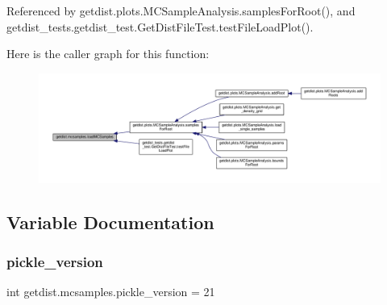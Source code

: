 Referenced by getdist.\+plots.\+M\+C\+Sample\+Analysis.\+samples\+For\+Root(), and getdist\+\_\+tests.\+getdist\+\_\+test.\+Get\+Dist\+File\+Test.\+test\+File\+Load\+Plot().

Here is the caller graph for this function\+:
\nopagebreak
\begin{figure}[H]
\begin{center}
\leavevmode
\includegraphics[width=350pt]{namespacegetdist_1_1mcsamples_a66a8bc2e3ca8236e828441cbf5db2cba_icgraph}
\end{center}
\end{figure}


\subsection{Variable Documentation}
\mbox{\label{namespacegetdist_1_1mcsamples_ac1aa58e9a915f4b3a863dae838ef8e5a}} 
\subsubsection{\texorpdfstring{pickle\+\_\+version}{pickle\_version}}
{\footnotesize\ttfamily int getdist.\+mcsamples.\+pickle\+\_\+version = 21}

